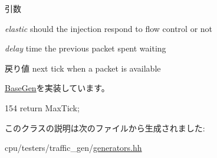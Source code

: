 \begin{DoxyParams}{引数}
\item[{\em elastic}]should the injection respond to flow control or not \item[{\em delay}]time the previous packet spent waiting \end{DoxyParams}
\begin{DoxyReturn}{戻り値}
next tick when a packet is available 
\end{DoxyReturn}


\hyperlink{classBaseGen_abee7e4d35054bbc37e9332bbd17f4a69}{BaseGen}を実装しています。


\begin{DoxyCode}
154 { return MaxTick; }
\end{DoxyCode}


このクラスの説明は次のファイルから生成されました:\begin{DoxyCompactItemize}
\item 
cpu/testers/traffic\_\-gen/\hyperlink{generators_8hh}{generators.hh}\end{DoxyCompactItemize}
